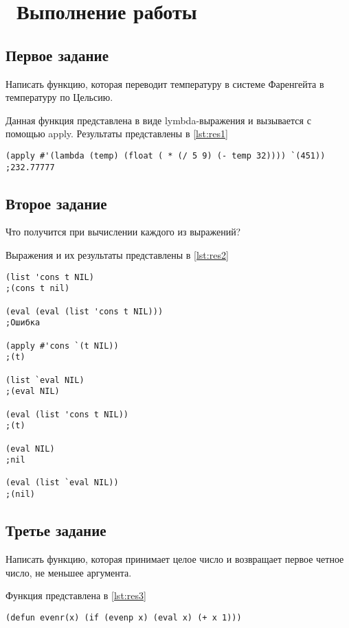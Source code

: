 \chapter{ Выполнение работы}
\label{cha:analysis}

\section{ Первое задание}
    Написать функцию, которая переводит температуру в системе Фаренгейта в температуру по Цельсию.

Данная функция представлена в виде lymbda-выражения и вызывается с помощью apply. Результаты представлены в  \ref{lst:res1}

\begin{lstlisting}[style=lispStyle, caption={ Функция и результат работы с аргументом 451.},
                    label={lst:res1}]
(apply #'(lambda (temp) (float ( * (/ 5 9) (- temp 32)))) `(451))
;232.77777
\end{lstlisting}

\section{ Второе задание}
Что получится при вычислении каждого из выражений?

Выражения и их результаты представлены в \ref{lst:res2}

\begin{lstlisting}[style=lispStyle, caption={ Выражения и их результаты.},
                    label={lst:res2}]
(list 'cons t NIL)
;(cons t nil)

(eval (eval (list 'cons t NIL)))
;Ошибка

(apply #'cons `(t NIL))
;(t)

(list `eval NIL)
;(eval NIL)

(eval (list 'cons t NIL))
;(t)

(eval NIL)
;nil

(eval (list `eval NIL))
;(nil)
\end{lstlisting}

\section{ Третье задание}
Написать функцию, которая принимает целое число и возвращает первое четное число, не меньшее аргумента.

Функция представлена в \ref{lst:res3}

\begin{lstlisting}[style=lispStyle, caption={ Представление функции.},
                    label={lst:res3}]
(defun evenr(x) (if (evenp x) (eval x) (+ x 1)))
\end{lstlisting}

